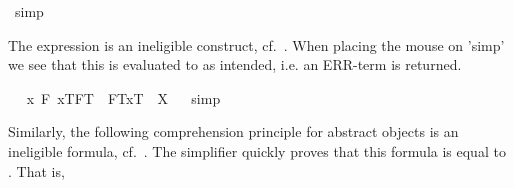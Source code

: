 \begin{isabellebody}
\ simp\ \isamarkupfalse%
%
\endisatagproof
{\isafoldproof}%
%
\isadelimproof
%
\endisadelimproof
%
\isamarkuptrue%
%
\begin{isamarkuptext}%
The expression  is an ineligible 
 construct, cf.~\cite[chap.4]{zalta11:_relat_versus_funct_found_logic}. 
 When placing the
 mouse on 'simp' we see that this is evaluated to  as intended, i.e. an ERR-term
 is returned.%
\end{isamarkuptext}\isamarkuptrue%
\ \isamarkupfalse%
\ {\isachardoublequoteopen}{\isacharparenleft}\isactrlbold {\isasymlambda}x{\isachardot}\ \isactrlbold {\isasymexists}F{\isachardot}\ {\isasymlbrace}x\isactrlsup T{\isacharcomma}F\isactrlsup T{\isasymrbrace}\ \isactrlbold {\isasymand}\ \isactrlbold {\isasymnot}{\isasymlparr}F\isactrlsup T{\isacharcomma}x\isactrlsup T{\isasymrparr}{\isacharparenright}\ {\isacharequal}\ X{\isachardoublequoteclose}%
\isadelimproof
\ %
\endisadelimproof
%
\isatagproof
{}\isamarkupfalse%
\ simp\ \isamarkupfalse%
\ \ %
%
\endisatagproof
{\isafoldproof}%
%
\isadelimproof
%
\endisadelimproof
%
\begin{isamarkuptext}%
Similarly, the following comprehension principle for abstract objects is an ineligible formula,  
  cf.~\cite[chap.4]{zalta11:_relat_versus_funct_found_logic}. The simplifier quickly proves that this
  formula  is equal to \isa{{\isacharasterisk}}. That is, 

\end{isamarkuptext}
\end{isabellebody}
